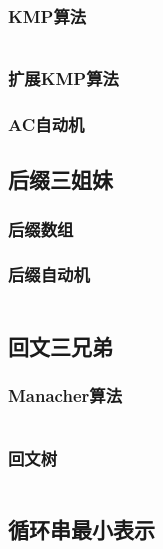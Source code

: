 \documentclass[a4paper]{article}
\newcommand{\cppcode}[1]{
    \inputminted[mathescape]{cpp}{source/#1}
}
\begin{document}
\subsubsection{KMP算法}

\cppcode{string-manipulation/knuth-morris-pratt.cpp}

\subsubsection{扩展KMP算法}

\subsubsection{AC自动机}


\subsection{后缀三姐妹}

\subsubsection{后缀数组}


\subsubsection{后缀自动机}

\cppcode{string-manipulation/suffix-automation.cpp}

\subsection{回文三兄弟}

\subsubsection{Manacher算法}

\cppcode{string-manipulation/manacher.cpp}

\subsubsection{回文树}

\cppcode{string-manipulation/palindrome-tree.cpp}

\subsection{循环串最小表示}
\end{document}
